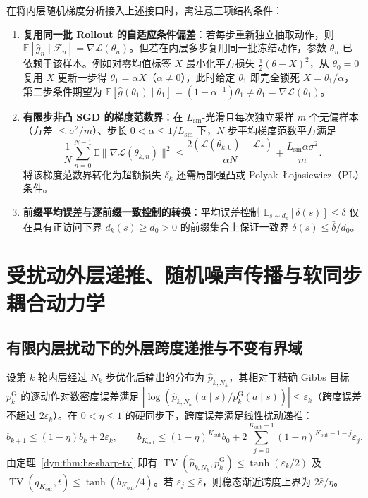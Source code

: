 \documentclass[lang=cn,scheme=chinese,openany]{elegantbook}
\newcommand{\E}{\mathbb E}
\newcommand{\TV}{\operatorname{TV}}
\begin{document}
在将内层随机梯度分析接入上述接口时，需注意三项结构条件：
\begin{enumerate}
\item \textbf{复用同一批 Rollout 的自适应条件偏差}：若每步重新独立抽取动作，则 $\E[\widehat g_n\mid\mathcal F_n]=\nabla\mathcal L(\theta_n)$。但若在内层多步复用同一批冻结动作，参数 $\theta_n$ 已依赖于该样本。例如对零均值标签 $X$ 最小化平方损失 $\frac12(\theta-X)^2$，从 $\theta_0=0$ 复用 $X$ 更新一步得 $\theta_1=\alpha X$（$\alpha\ne 0$），此时给定 $\theta_1$ 即完全锁死 $X=\theta_1/\alpha$，第二步条件期望为 $\E[\widehat g(\theta_1)\mid\theta_1]=(1-\alpha^{-1})\theta_1\ne\theta_1=\nabla\mathcal L(\theta_1)$。
\item \textbf{有限步非凸 SGD 的梯度范数界}：在 $L_{\mathrm{sm}}$-光滑且每次独立采样 $m$ 个无偏样本（方差 $\le\sigma^2/m$）、步长 $0<\alpha\le 1/L_{\mathrm{sm}}$ 下，$N$ 步平均梯度范数平方满足
\begin{equation*}
\frac1N\sum_{n=0}^{N-1}\mathbb E\|\nabla\mathcal L(\theta_{k,n})\|^2
\le\frac{2(\mathcal L(\theta_{k,0})-\mathcal L_*)}{\alpha N}
+\frac{L_{\mathrm{sm}}\alpha\sigma^2}{m}.
\end{equation*}
将该梯度范数界转化为超额损失 $\delta_k$ 还需局部强凸或 Polyak--\L{}ojasiewicz（PL）条件。
\item \textbf{前缀平均误差与逐前缀一致控制的转换}：平均误差控制 $\E_{s\sim d_k}[\delta(s)]\le\bar\delta$ 仅在具有正访问下界 $d_k(s)\ge d_0>0$ 的前缀集合上保证一致界 $\delta(s)\le\bar\delta/d_0$。
\end{enumerate}

\section{受扰动外层递推、随机噪声传播与软同步耦合动力学}
\label{dyn:sec:hs-noise}

\subsection{有限内层扰动下的外层跨度递推与不变有界域}

设第 $k$ 轮内层经过 $N_k$ 步优化后输出的分布为 $\widehat p_{k,N_k}$，其相对于精确 Gibbs 目标 $p_k^{\mathrm G}$ 的逐动作对数密度误差满足 $|\log(\widehat p_{k,N_k}(a\mid s)/p_k^{\mathrm G}(a\mid s))|\le\varepsilon_k$（跨度误差不超过 $2\varepsilon_k$）。在 $0<\eta\le 1$ 的硬同步下，跨度误差满足线性扰动递推：
\begin{equation}\label{dyn:eq:outer-error-recursion}
b_{k+1}\le(1-\eta)b_k+2\varepsilon_k,
\qquad
b_{K_{\mathrm{out}}}\le(1-\eta)^{K_{\mathrm{out}}} b_0
+2\sum_{j=0}^{K_{\mathrm{out}}-1}(1-\eta)^{K_{\mathrm{out}}-1-j}\varepsilon_j.
\end{equation}
由定理~\ref{dyn:thm:hs-sharp-tv} 即有 $\TV(\widehat p_{k,N_k},p_k^{\mathrm G})\le\tanh(\varepsilon_k/2)$ 及 $\TV(q_{K_{\mathrm{out}}},t)\le\tanh(b_{K_{\mathrm{out}}}/4)$。若 $\varepsilon_j\le\bar\varepsilon$，则稳态渐近跨度上界为 $2\bar\varepsilon/\eta$。
\end{document}
